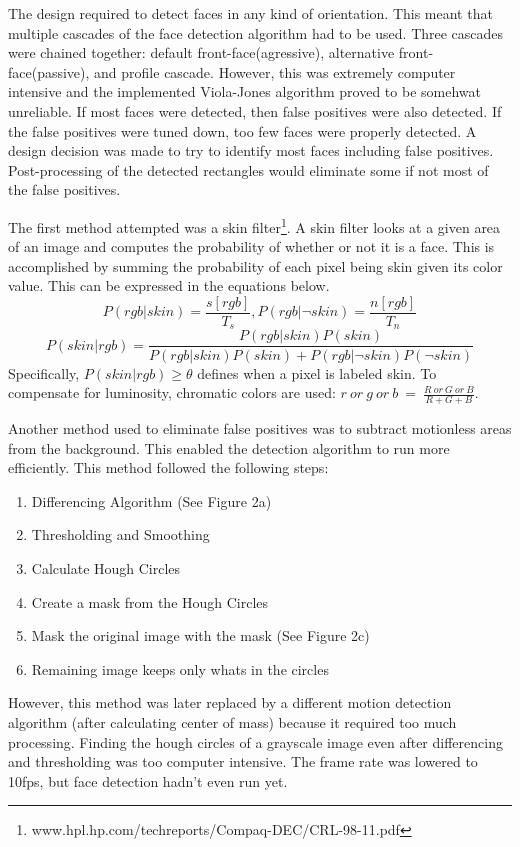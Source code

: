 \documentclass{acm_proc_article-sp}
\begin{document}
The design required to detect faces in any kind of orientation.  This meant that multiple cascades of the face detection algorithm had to be used.
Three cascades were chained together: default front-face(agressive), alternative front-face(passive), and profile cascade.  
However, this was extremely computer intensive and the implemented Viola-Jones algorithm proved to be somehwat unreliable.  
If most faces were detected, then false positives were also detected.  If the false positives were tuned down, too few faces were properly detected.  
A design decision was made to try to identify most faces including false positives.
Post-processing of the detected rectangles would eliminate some if not most of the false positives.

The first method attempted was a skin filter\footnote{www.hpl.hp.com/techreports/Compaq-DEC/CRL-98-11.pdf}.
A skin filter looks at a given area of an image and computes the probability of whether or not it is a face.
This is accomplished by summing the probability of each pixel being skin given its color value.  
This can be expressed in the equations below.
\begin{equation}
\label{eq:skinfilter1}
P(rgb|skin) = \frac{s[rgb]}{T_s}, P(rgb|\neg skin) = \frac{n[rgb]}{T_n}
\end{equation}
\begin{equation}
\label{eq:skinfilter2}
P(skin|rgb) = \frac{P(rgb|skin)P(skin)}{P(rgb|skin)P(skin) + P(rgb|\neg skin)P(\neg skin)}
\end{equation}
Specifically, $P(skin|rgb) \geq \theta$ defines when a pixel is labeled skin.  To compensate
for luminosity, chromatic colors are used: $r\ or\ g\ or\ b\ =\ \frac{R\ or\ G\ or\ B}{R+G+B}$.  

Another method used to eliminate false positives was to subtract motionless areas from the background.
This enabled the detection algorithm to run more efficiently.
This method followed the following steps:
\begin{enumerate}
\item Differencing Algorithm (See Figure 2a)
\item Thresholding and Smoothing
\item Calculate Hough Circles
\item Create a mask from the Hough Circles
\item Mask the original image with the mask (See Figure 2c)
\item Remaining image keeps only whats in the circles
\end{enumerate}
However, this method was later replaced by a different motion detection algorithm (after calculating center of mass) 
because it required too much processing. Finding the hough circles of a grayscale image even after differencing and 
thresholding was too computer intensive. The frame rate was lowered to 10fps, but face detection hadn't even run yet.
\end{document}
